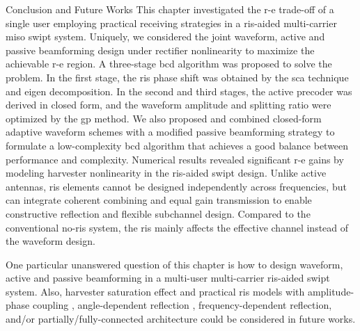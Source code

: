 \begin{section}{Conclusion and Future Works}\label{sc:conclusion_and_future_works}
	This chapter investigated the \gls{r-e} trade-off of a single user employing practical receiving strategies in a \gls{ris}-aided multi-carrier \gls{miso} \gls{swipt} system. Uniquely, we considered the joint waveform, active and passive beamforming design under rectifier nonlinearity to maximize the achievable \gls{r-e} region. A three-stage \gls{bcd} algorithm was proposed to solve the problem. In the first stage, the \gls{ris} phase shift was obtained by the \gls{sca} technique and eigen decomposition. In the second and third stages, the active precoder was derived in closed form, and the waveform amplitude and splitting ratio were optimized by the \gls{gp} method. We also proposed and combined closed-form adaptive waveform schemes with a modified passive beamforming strategy to formulate a low-complexity \gls{bcd} algorithm that achieves a good balance between performance and complexity. Numerical results revealed significant \gls{r-e} gains by modeling harvester nonlinearity in the \gls{ris}-aided \gls{swipt} design. Unlike active antennas, \gls{ris} elements cannot be designed independently across frequencies, but can integrate coherent combining and equal gain transmission to enable constructive reflection and flexible subchannel design. Compared to the conventional no-\gls{ris} system, the \gls{ris} mainly affects the effective channel instead of the waveform design.

	One particular unanswered question of this chapter is how to design waveform, active and passive beamforming in a multi-user multi-carrier \gls{ris}-aided \gls{swipt} system. Also, harvester saturation effect and practical \gls{ris} models with amplitude-phase coupling \cite{Abeywickrama2020}, angle-dependent reflection \cite{Tang2021}, frequency-dependent reflection, and/or partially/fully-connected architecture \cite{Shen2020a} could be considered in future works.
\end{section}
